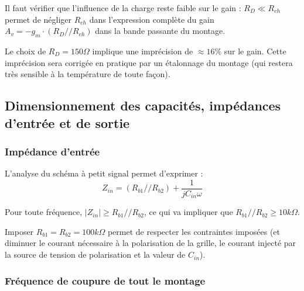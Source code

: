 \documentclass[11pt,a4paper]{article}
\theoremstyle{definition}%
\begin{document}
{Il faut vérifier que l'influence de la charge reste faible sur le gain : $R_D\ll R_{ch}$ permet de négliger $R_{ch}$ dans l'expression complète du gain $A_v=-g_m\cdot \left( R_D//R_{ch} \right)$ dans la bande passante du montage.

Le choix de $R_D=150\Omega$ implique une imprécision de $\approx 16\%$ sur le gain. %
Cette imprécision sera corrigée en pratique par un étalonnage du montage (qui restera très sensible à la température de toute façon).

\begin{center}
\end{center}

\subsection{Dimensionnement des capacités, impédances d'entrée et de sortie}

\subsubsection{Impédance d'entrée}
L'analyse du schéma à petit signal permet d'exprimer : $$Z_{in}=(R_{b1}//R_{b2})+\frac{1}{jC_{in}\omega}$$

Pour toute fréquence, $\left|Z_{in}\right|\geq R_{b1}//R_{b2}$, ce qui va impliquer que $R_{b1}//R_{b2}\geq 10k\Omega$.

Imposer $R_{b1}=R_{b2}=100k\Omega$ permet de respecter les contraintes imposées (et diminuer le courant nécessaire à la polarisation de la grille, le courant injecté par la source de tension de polarisation et la valeur de $C_{in}$).

\subsubsection{Fréquence de coupure de tout le montage}

}
\end{document}
